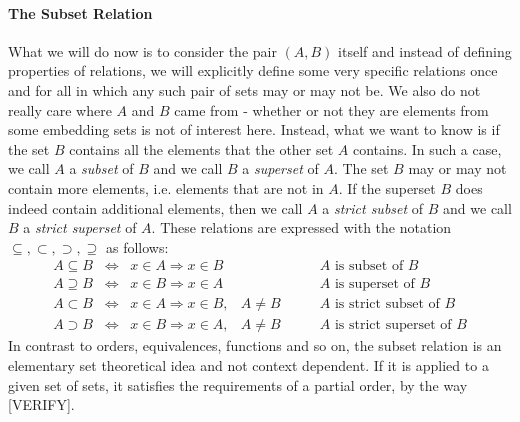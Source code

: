 \paragraph{The Subset Relation} 
What we will do now is to consider the pair $(A,B)$ itself and instead of defining properties of relations, we will explicitly define some very specific relations once and for all in which any such pair of sets may or may not be. We also do not really care where $A$ and $B$ came from - whether or not they are elements from some embedding sets is not of interest here. Instead, what we want to know is if the set $B$ contains all the elements that the other set $A$ contains. In such a case, we call $A$ a \emph{subset} of $B$ and we call $B$ a \emph{superset} of $A$. The set $B$ may or may not contain more elements, i.e. elements that are not in $A$. If the superset $B$ does indeed contain additional elements, then we call $A$ a \emph{strict subset} of $B$ and we call $B$ a \emph{strict superset} of $A$. These relations are expressed with the notation $\subseteq, \subset, \supset, \supseteq$ as follows:
\begin{eqnarray}
A \subseteq B \;\;  \Leftrightarrow \;\;   x \in A \Rightarrow x \in B&           \qquad & \text{$A$ is subset of $B$} \\
A \supseteq B \;\;  \Leftrightarrow \;\;   x \in B \Rightarrow x \in A&           \qquad & \text{$A$ is superset of $B$} \\
A \subset   B \;\;  \Leftrightarrow \;\;   x \in A \Rightarrow x \in B,& A \neq B \qquad & \text{$A$ is strict subset of $B$} \\
A \supset   B \;\;  \Leftrightarrow \;\;   x \in B \Rightarrow x \in A,& A \neq B \qquad & \text{$A$ is strict superset of $B$}
\end{eqnarray}
In contrast to orders, equivalences, functions and so on, the subset relation is an elementary set theoretical idea and not context dependent. If it is applied to a given set of sets, it satisfies the requirements of a partial order, by the way [VERIFY].


